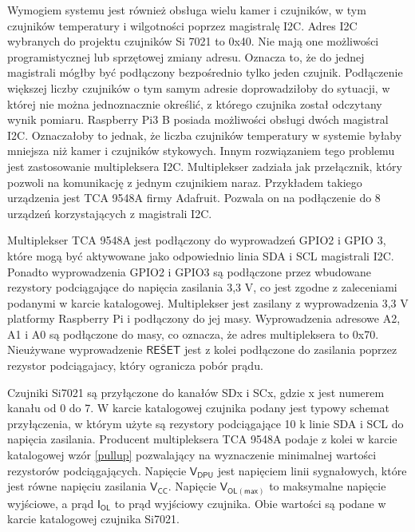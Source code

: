\documentclass[a4paper,12pt,twoside]{article}
\begin{document}
Wymogiem systemu jest również obsługa wielu kamer i czujników, w tym czujników temperatury i wilgotności poprzez magistralę I2C. Adres I2C wybranych do projektu czujników Si 7021 to 0x40. Nie mają one możliwości programistycznej lub sprzętowej zmiany adresu. Oznacza to, że do jednej magistrali mógłby być podłączony bezpośrednio tylko jeden czujnik. Podłączenie większej liczby czujników o tym samym adresie doprowadziłoby do sytuacji, w której nie można jednoznacznie określić, z którego czujnika został odczytany wynik pomiaru. Raspberry Pi3 B posiada możliwości obsługi dwóch magistral I2C. Oznaczałoby to jednak, że liczba czujników temperatury w systemie byłaby mniejsza niż kamer i czujników stykowych. Innym rozwiązaniem tego problemu jest zastosowanie multipleksera I2C. Multiplekser zadziała jak przełącznik, który pozwoli na komunikację z jednym czujnikiem naraz. Przykładem takiego urządzenia jest TCA 9548A firmy Adafruit. Pozwala on na podłączenie do 8 urządzeń korzystających z magistrali I2C.

Multiplekser TCA 9548A jest podłączony do wyprowadzeń GPIO2 i GPIO 3, które mogą być aktywowane jako odpowiednio linia SDA i SCL magistrali I2C. Ponadto wyprowadzenia GPIO2 i GPIO3 są podłączone przez wbudowane rezystory podciągające do napięcia zasilania 3,3 V\cite{rpi_schematic}, co jest zgodne z zaleceniami podanymi w karcie katalogowej.\cite{multiplekser} Multiplekser jest zasilany z wyprowadzenia 3,3 V platformy Raspberry Pi i podłączony do jej masy. Wyprowadzenia adresowe A2, A1 i A0 są podłączone do masy, co oznacza, że adres multipleksera to 0x70. Nieużywane wyprowadzenie $\overline{\mathsf{RESET}}$ jest z kolei podłączone do zasilania poprzez rezystor podciągajacy, który ogranicza pobór prądu.

Czujniki Si7021 są przyłączone do kanałów SDx i SCx, gdzie x jest numerem kanału od 0 do 7. W karcie katalogowej czujnika podany jest typowy schemat przyłączenia, w którym użyte są rezystory podciągające 10 k\textOmega\hspace{0.2em} linie SDA i SCL do napięcia zasilania. Producent multipleksera TCA 9548A podaje z kolei w karcie katalogowej wzór \ref{pullup} pozwalający na wyznaczenie minimalnej wartości rezystorów podciągających.\cite{multiplekser} Napięcie $\mathsf{V_{DPU}}$ jest napięciem linii sygnałowych, które jest równe napięciu zasilania $\mathsf{V_{CC}}$. Napięcie $\mathsf{V_{OL(max)}}$ to maksymalne napięcie wyjściowe, a prąd $\mathsf{I_{OL}}$ to prąd wyjściowy czujnika. Obie wartości są podane w karcie katalogowej czujnika Si7021.\cite{czujnik_temp}
\end{document}
